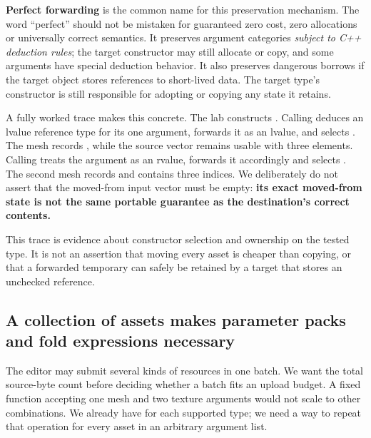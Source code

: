 \textbf{Perfect forwarding} is the common name for this preservation mechanism. The word ``perfect'' should not be mistaken for guaranteed zero cost, zero allocations or universally correct semantics. It preserves argument categories \emph{subject to C++ deduction rules}; the target constructor may still allocate or copy, and some arguments have special deduction behavior. It also preserves dangerous borrows if the target object stores references to short-lived data. The target type's constructor is still responsible for adopting or copying any state it retains.

A fully worked trace makes this concrete. The lab constructs . Calling  deduces an lvalue reference type for its one argument, forwards it as an lvalue, and selects . The mesh records , while the source vector remains usable with three elements. Calling  treats the argument as an rvalue, forwards it accordingly and selects . The second mesh records  and contains three indices. We deliberately do not assert that the moved-from input vector must be empty: \textbf{its exact moved-from state is not the same portable guarantee as the destination's correct contents.}

This trace is evidence about constructor selection and ownership on the tested type. It is not an assertion that moving every asset is cheaper than copying, or that a forwarded temporary can safely be retained by a target that stores an unchecked reference.

\subsection{A collection of assets makes parameter packs and fold expressions necessary}\label{05-engine-i-ch005-a-collection-of-assets-makes-parameter-packs-and-fold-expressions-necessary}

\hypertarget{05-engine-i-ch005-a-collection-of-assets-makes-parameter-packs-and-fold-expressions-necessary}{}

The editor may submit several kinds of resources in one batch. We want the total source-byte count before deciding whether a batch fits an upload budget. A fixed function accepting one mesh and two texture arguments would not scale to other combinations. We already have  for each supported type; we need a way to repeat that operation for every asset in an arbitrary argument list.

